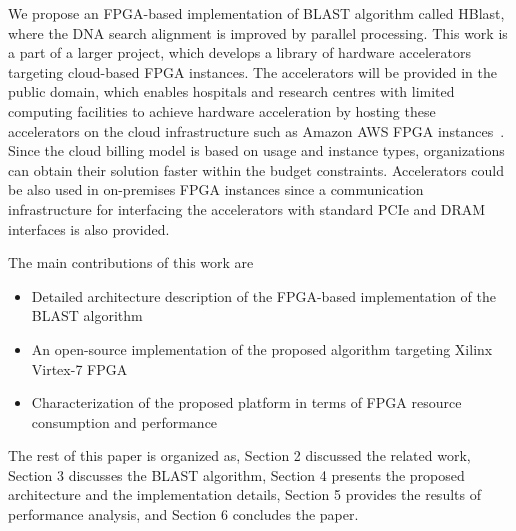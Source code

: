 We propose an FPGA-based implementation of BLAST algorithm called HBlast, where the DNA search alignment is improved by parallel processing. 
This work is a part of a larger project, which develops a library of hardware accelerators targeting cloud-based FPGA instances.
The accelerators will be provided in the public domain, which enables hospitals and research centres with limited computing facilities to achieve hardware acceleration by hosting these accelerators on the cloud infrastructure such as Amazon AWS FPGA instances~\cite{}.
Since the cloud billing model is based on usage and instance types, organizations can obtain their solution faster within the budget constraints.
Accelerators could be also used in on-premises FPGA instances since a communication infrastructure for interfacing the accelerators with standard PCIe and DRAM interfaces is also provided.

The main contributions of this work are
\begin{itemize}
\item Detailed architecture description of the FPGA-based implementation of the BLAST algorithm
\item An open-source implementation of the proposed algorithm targeting Xilinx Virtex-7 FPGA
\item Characterization of the proposed platform in terms of FPGA resource consumption and performance
\end{itemize}

The rest of this paper is organized as, Section 2 discussed the related work, Section 3 discusses the BLAST algorithm, Section 4 presents the proposed architecture and the implementation details, Section 5 provides the results of performance analysis, and Section 6 concludes the paper.